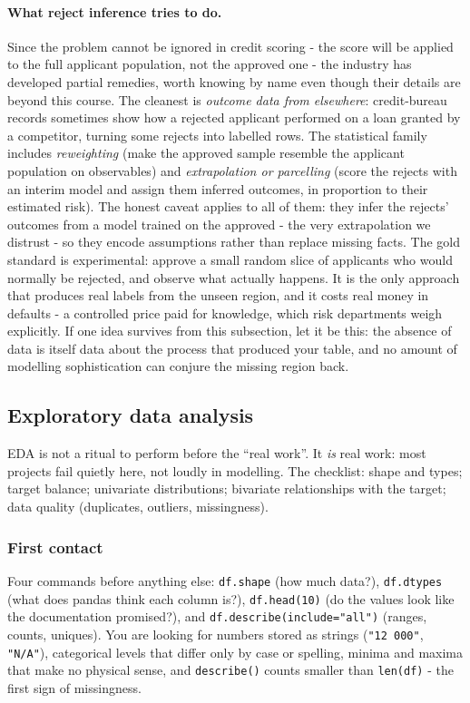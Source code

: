 \documentclass[11pt,a4paper]{article}
\begin{document}
\paragraph{What reject inference tries to do.} Since the problem cannot be
ignored in credit scoring - the score will be applied to the full
applicant population, not the approved one - the industry has developed
partial remedies, worth knowing by name even though their details are
beyond this course. The cleanest is \emph{outcome data from elsewhere}:
credit-bureau records sometimes show how a rejected applicant performed on
a loan granted by a competitor, turning some rejects into labelled rows.
The statistical family includes \emph{reweighting} (make the approved
sample resemble the applicant population on observables) and
\emph{extrapolation or parcelling} (score the rejects with an interim
model and assign them inferred outcomes, in proportion to their estimated
risk). The honest caveat applies to all of them: they infer the rejects'
outcomes from a model trained on the approved - the very extrapolation we
distrust - so they encode assumptions rather than replace missing facts.
The gold standard is experimental: approve a small random slice of
applicants who would normally be rejected, and observe what actually
happens. It is the only approach that produces real labels from the
unseen region, and it costs real money in defaults - a controlled price
paid for knowledge, which risk departments weigh explicitly. If one idea
survives from this subsection, let it be this: the absence of data is
itself data about the process that produced your table, and no amount of
modelling sophistication can conjure the missing region back.

\subsection{Exploratory data analysis}
\label{sec:eda}
EDA is not a ritual to perform before the ``real work''. It \emph{is} real
work: most projects fail quietly here, not loudly in modelling. The
checklist: shape and types; target balance; univariate distributions;
bivariate relationships with the target; data quality (duplicates, outliers,
missingness).

\subsubsection{First contact}
Four commands before anything else: \texttt{df.shape} (how much data?),
\texttt{df.dtypes} (what does pandas think each column is?),
\texttt{df.head(10)} (do the values look like the documentation promised?),
and \texttt{df.describe(include="all")} (ranges, counts, uniques). You are
looking for numbers stored as strings (\texttt{"12 000"}, \texttt{"N/A"}),
categorical levels that differ only by case or spelling, minima and maxima
that make no physical sense, and \texttt{describe()} counts smaller than
\texttt{len(df)} - the first sign of missingness.
\end{document}
